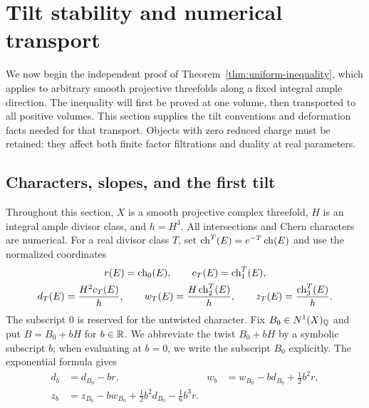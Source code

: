\section{Tilt stability and numerical transport}
\label{sec:tilt}

We now begin the independent proof of
Theorem~\ref{thm:uniform-inequality}, which applies to arbitrary smooth
projective threefolds along a fixed integral ample direction.  The
inequality will first be proved at one volume, then transported to all
positive volumes.  This section supplies the tilt conventions and
deformation facts needed for that transport.  Objects with zero reduced
charge must be retained: they affect both finite factor filtrations and
duality at real parameters.

\subsection{Characters, slopes, and the first tilt}

Throughout this section, $X$ is a smooth projective complex threefold,
$H$ is an integral ample divisor class, and $h=H^3$.  All intersections
and Chern characters are numerical.  For a real divisor class $T$, set
$\operatorname{ch}^T(E)=e^{-T}\operatorname{ch}(E)$ and use the normalized coordinates
\begin{equation}\label{eq:normalized-characters}
\begin{gathered}
 r(E)=\operatorname{ch}_0(E),\qquad c_T(E)=\operatorname{ch}_1^T(E),\\
 d_T(E)=\frac{H^2c_T(E)}h,\qquad
 w_T(E)=\frac{H\operatorname{ch}_2^T(E)}h,\qquad
 z_T(E)=\frac{\operatorname{ch}_3^T(E)}h.
\end{gathered}
\end{equation}
The subscript $0$ is reserved for the untwisted character.  Fix
$B_0\in N^1(X)_{\mathbb Q}$ and put $B=B_0+bH$ for $b\in\mathbb R$.
We abbreviate the twist $B_0+bH$ by a symbolic subscript $b$;
when evaluating at $b=0$, we write the subscript $B_0$ explicitly.
The exponential formula gives
\begin{align}
 d_b&=d_{B_0}-br,&
 w_b&=w_{B_0}-b d_{B_0}+\tfrac12b^2r,\label{eq:twist-two}\\
 z_b&=z_{B_0}-b w_{B_0}+\tfrac12b^2d_{B_0}-\tfrac16b^3r.
 \label{eq:twist-three}
\end{align}

